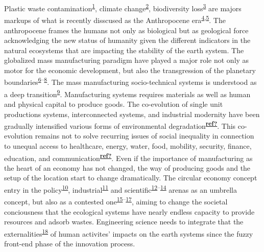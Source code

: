 \documentclass[
  11pt,
  a4paperpaper,
  onecolumn]{article}
\begin{document}
Plastic waste
contamination\textsuperscript{\protect\hyperlink{ref-de-la-torre2021}{1}},
climate change\textsuperscript{\protect\hyperlink{ref-stoddard2021}{2}},
biodiversity
loss\textsuperscript{\protect\hyperlink{ref-hermoso2022}{3}} are majors
markups of what is recently disscused as the Anthropocene
era\textsuperscript{\protect\hyperlink{ref-steffen2018}{4},\protect\hyperlink{ref-steffen2011}{5}}.
The anthropocene frames the humans not only as biological but as
geological force acknowledging the new status of humanity given the
different indicators in the natural ecosystems that are impacting the
stability of the earth system. The globalized mass manufacturing
paradigm have played a major role not only as motor for the economic
development, but also the transgression of the planetary
boundaries\textsuperscript{\protect\hyperlink{ref-ONeill2018}{6}--\protect\hyperlink{ref-Rockstrom2009}{8}}.
The mass manufacturing socio-technical systems is understood as a deep
transition\textsuperscript{\protect\hyperlink{ref-kanger2022}{9}}.
Manufacturing systems requires materials as well as human and physical
capital to produce goods. The co-evolution of single unit productions
systems, interconnected systems, and industrial modernity have been
gradually intensified various forms of environmental
degradation\textsuperscript{\protect\hyperlink{ref-ref}{\textbf{ref?}}}.
This co-evolution remains not to solve recurring issues of social
inequality in connection to unequal access to healthcare, energy, water,
food, mobility, security, finance, education, and
communication\textsuperscript{\protect\hyperlink{ref-ref}{\textbf{ref?}}}.
Even if the importance of manufacturing as the heart of an economy has
not changed, the way of producing goods and the setup of the location
start to change dramatically. The circular economy concept entry in the
policy\textsuperscript{\protect\hyperlink{ref-EC2015}{10}},
industrial\textsuperscript{\protect\hyperlink{ref-EllenMacArthurFoundation2015}{11}}
and
scientific\textsuperscript{\protect\hyperlink{ref-nobre2021}{12}--\protect\hyperlink{ref-Schoggl2020}{14}}
arenas as an umbrella concept, but also as a contested
one\textsuperscript{\protect\hyperlink{ref-CalistoFriant2020}{15}--\protect\hyperlink{ref-corvellec2021}{17}},
aiming to change the societal conciousness that the ecological systems
have nearly endless capacity to provide resources and adsorb wastes.
Engineering science needs to integrate that the
externalities\textsuperscript{\protect\hyperlink{ref-zhen2021}{18}} of
human activites' impacts on the earth systems since the fuzzy front-end
phase of the innovation process.
\end{document}

